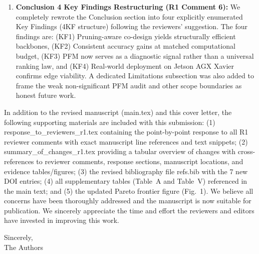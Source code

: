 \documentclass[conference]{IEEEtran}
\begin{document}
\begin{enumerate}
    \item \textbf{Conclusion 4 Key Findings Restructuring (R1 Comment 6):} We completely rewrote the Conclusion section into four explicitly enumerated Key Findings (4KF structure) following the reviewers' suggestion. The four findings are: (KF1) Pruning-aware co-design yields structurally efficient backbones, (KF2) Consistent accuracy gains at matched computational budget, (KF3) PFM now serves as a diagnostic signal rather than a universal ranking law, and (KF4) Real-world deployment on Jetson AGX Xavier confirms edge viability. A dedicated Limitations subsection was also added to frame the weak non-significant PFM audit and other scope boundaries as honest future work.
\end{enumerate}

In addition to the revised manuscript (main.tex) and this cover letter, the following supporting materials are included with this submission: (1) response\_to\_reviewers\_r1.tex containing the point-by-point response to all R1 reviewer comments with exact manuscript line references and text snippets; (2) summary\_of\_changes\_r1.tex providing a tabular overview of changes with cross-references to reviewer comments, response sections, manuscript locations, and evidence tables/figures; (3) the revised bibliography file refs.bib with the 7 new DOI entries; (4) all supplementary tables (Table~A and Table~V) referenced in the main text; and (5) the updated Pareto frontier figure (Fig.~1). We believe all concerns have been thoroughly addressed and the manuscript is now suitable for publication. We sincerely appreciate the time and effort the reviewers and editors have invested in improving this work.

Sincerely,\\
The Authors
\end{document}
